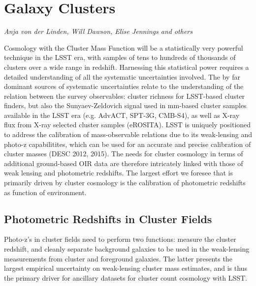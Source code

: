 
\section{Galaxy Clusters}
\label{sec:clusters}
{\it Anja von der Linden, Will Dawson, Elise Jennings and others}


Cosmology with the Cluster Mass Function will be a statistically very powerful technique in the LSST era, with samples of tens to hundreds of thousands of clusters over a wide range in redshift.  Harnessing this statistical power requires a detailed understanding of all the systematic uncertainties involved.  The by far dominant sources of systematic uncertainties relate to the understanding of the relation between the survey observables: cluster richness for LSST-based cluster finders, but also the Sunyaev-Zeldovich signal used in mm-based cluster samples available in the LSST era (e.g. AdvACT, SPT-3G, CMB-S4), as well as X-ray flux from X-ray selected cluster samples (eROSITA).  LSST is uniquely positioned to address the calibration of mass-observable relations due to its weak-lensing and photo-z capabilitites, which can be used for an accurate and precise calibration of cluster masses (DESC 2012, 2015).  The needs for cluster cosmology in terms of additional ground-based OIR data are therefore intricately linked with those of weak lensing and photometric redshifts.  The largest effort we foresee that is primarily driven by cluster cosmology is the calibration of photometric redshifts as function of environment.



\subsection{Photometric Redshifts in Cluster Fields}

Photo-z's in cluster fields need to perform two functions: measure the cluster redshift, and cleanly separate background galaxies to be used in the weak-lensing measurements from cluster and foreground galaxies.  The latter presents the largest empirical uncertainty on weak-lensing cluster mass estimates, and is thus the primary driver for ancillary datasets for cluster count cosmology with LSST. 

